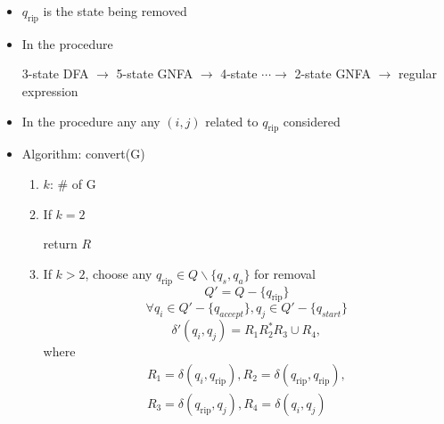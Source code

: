 \begin{frame}[allowframebreaks]
\begin{itemize}
  \begin{center}
\end{center}


  \begin{center}
\end{center}
\item $q_{\text{rip}}$ is the state being removed
\item In the procedure 
  
3-state DFA $\rightarrow $ 5-state GNFA
$\rightarrow$ 4-state $\cdots \rightarrow$ 2-state GNFA $\rightarrow$
regular expression
\item In the procedure any any $(i,j)$ related to $q_{\text{rip}}$ considered
\item Algorithm: convert(G)
  \begin{enumerate}
  \item $k$: \# of G
  \item If $k=2$
    \begin{center}
      return $R$
    \end{center}

  \item If $k > 2$, choose any $q_{\text{rip}} \in Q \backslash \{q_s,
    q_a\}$ for removal
\begin{equation*}
  Q'
=Q - \{q_{\text{rip}}\}
\end{equation*}
\begin{equation*}
  \forall q_i \in Q' - \{q_{accept}\},
q_j \in Q' - \{q_{start}\}
\end{equation*}
\begin{equation*}
  \delta'(q_i,q_j)
= R_1 R_2^* R_3 \cup R_4,
\end{equation*}
where
\begin{gather*}
R_1=\delta(q_i,q_{\text{rip}}),
R_2=\delta(q_{\text{rip}},q_{\text{rip}}),
\\
R_3 =\delta(q_{\text{rip}},q_j), 
R_4=\delta(q_i,q_j)
\end{gather*}


\end{enumerate}
\end{itemize}
\end{frame}
